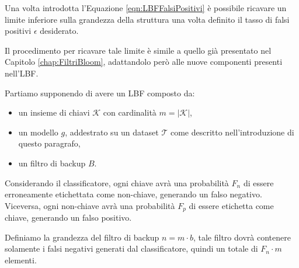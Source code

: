 \documentclass[../../main.tex]{subfiles}
\begin{document}
    Una volta introdotta l'Equazione \eqref{eqn:LBFFalsiPositivi} è possibile ricavare un limite inferiore sulla grandezza della struttura una volta definito il tasso di falsi positivi $\epsilon$ desiderato.

    Il procedimento per ricavare tale limite è simile a quello già presentato nel Capitolo \ref{chap:FiltriBloom}, adattandolo però alle nuove componenti presenti nell'LBF.

    Partiamo supponendo di avere un LBF composto da: 
    \begin{itemize}
        \item un insieme di chiavi $\mathcal{K}$ con cardinalità $m = |\mathcal{K}|$,
        \item un modello $g$, addestrato su un dataset $\mathcal{T}$ come descritto nell'introduzione di questo paragrafo,
        \item un filtro di backup $B$.
    \end{itemize}
    Considerando il classificatore, ogni chiave avrà una probabilità $F_n$ di essere erroneamente etichettata come non-chiave, generando un falso negativo. Viceversa, ogni non-chiave avrà una probabilità $F_p$ di essere etichetta come chiave, generando un falso positivo. 
    
    Definiamo  la grandezza del filtro di backup $n = m \cdot b$, tale filtro dovrà contenere solamente i falsi negativi generati dal classificatore, quindi un totale di $F_n \cdot m$ elementi.
\end{document}
